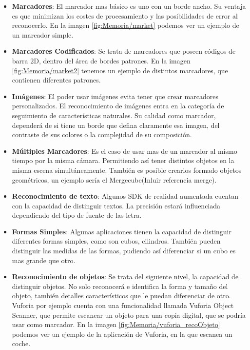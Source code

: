 \begin{itemize}
	\item \textbf{Marcadores}: El marcador mas básico es uno con un borde ancho. Su ventaja es que minimizan los costes de procesamiento y las posibilidades de error al reconocerlo. En la imagen \ref{fig:Memoria/market} podemos ver un ejemplo de un marcador simple.\\		
	\item \textbf{Marcadores Codificados}:
	Se trata de marcadores que poseen códigos de barra 2D, dentro del área de bordes patrones. En la imagen \ref{fig:Memoria/market2} tenemos un ejemplo de distintos marcadores, que contienen diferentes patrones.
	\item \textbf{Imágenes}:		
	El poder usar imágenes evita tener que crear marcadores personalizados. El reconocimiento de imágenes entra en la categoría de seguimiento de características naturales. Su calidad como marcador, dependerá de si tiene un borde que defina claramente esa imagen, del contraste de sus colores o la complejidad de su composición.
	\item \textbf{Múltiples Marcadores}:
	Es el caso de usar mas de un marcador al mismo tiempo por la misma cámara. Permitiendo así tener distintos objetos en la misma escena simultáneamente. También es posible crearlos formado objetos geométricos, un ejemplo sería el Mergecube(Inluir referencia merge).
	\item \textbf{Reconocimiento de texto}:
	Algunos SDK de realidad aumentada cuentan con la capacidad de distinguir textos. La precisión estará influenciada dependiendo del tipo de fuente de las letra. 
	\item \textbf{Formas Simples}:
	Algunas aplicaciones tienen la capacidad de distinguir diferentes formas simples, como son cubos, cilindros. También pueden distinguir las medidas de las formas, pudiendo así diferenciar si un cubo es mas grande que otro.
	\item \textbf{Reconocimiento de objetos}:		
	Se trata del siguiente nivel, la capacidad de distinguir objetos. No solo reconocerá e identifica la forma y tamaño del objeto, también detalles característicos que le puedan diferenciar de otro. Vuforia por ejemplo cuenta con una funcionalidad llamada Vuforia Object Scanner, que permite escanear un objeto para una copia digital, que se podría usar como marcador. En la imagen \ref{fig:Memoria/vuforia_recoObjeto} podemos ver un ejemplo de la aplicación de Vuforia, en la que escanea un coche.  
	
\end{itemize}

